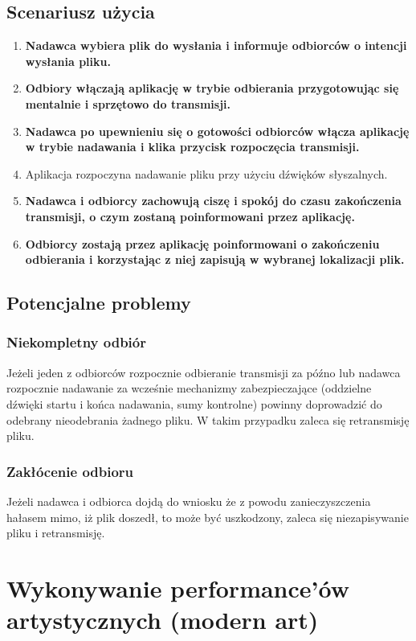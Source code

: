 \documentclass{article}
\begin{document}
\subsection{Scenariusz użycia}
\begin{enumerate}
	\normalfont \item \bf Nadawca \normalfont wybiera plik do wysłania i informuje \bf odbiorców \normalfont o intencji wysłania pliku.
	\item \bf Odbiory \normalfont włączają aplikację w trybie odbierania przygotowując się mentalnie i sprzętowo do transmisji.
	\item \bf Nadawca \normalfont po upewnieniu się o gotowości \bf odbiorców \normalfont włącza aplikację w trybie nadawania i klika przycisk rozpoczęcia transmisji.
	\item Aplikacja rozpoczyna nadawanie pliku przy użyciu dźwięków słyszalnych.
	\item \bf Nadawca \normalfont i \bf odbiorcy \normalfont zachowują ciszę i spokój do czasu zakończenia transmisji, o czym zostaną poinformowani przez aplikację.
	\item \bf Odbiorcy \normalfont zostają przez aplikację poinformowani o zakończeniu odbierania i korzystając z niej zapisują w wybranej lokalizacji plik.
\end{enumerate}

\subsection{Potencjalne problemy}
\subsubsection{Niekompletny odbiór}
\normalfont
Jeżeli jeden z odbiorców rozpocznie odbieranie transmisji za późno lub nadawca rozpocznie nadawanie za wcześnie mechanizmy zabezpieczające (oddzielne dźwięki startu i końca nadawania, sumy kontrolne) powinny doprowadzić do odebrany nieodebrania żadnego pliku. W takim przypadku zaleca się retransmisję pliku.
\subsubsection{Zakłócenie odbioru}
\normalfont
Jeżeli nadawca i odbiorca dojdą do wniosku że z powodu zanieczyszczenia hałasem mimo, iż plik doszedł, to może być uszkodzony, zaleca się niezapisywanie pliku i retransmisję.


\newpage
\section{Wykonywanie performance'ów artystycznych (modern art)}
\end{document}
